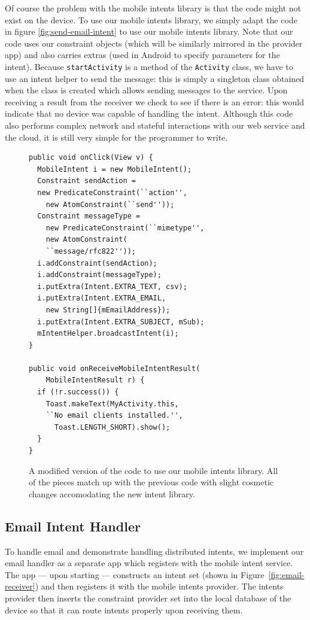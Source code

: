 \documentclass{acm_proc_article-sp}
\begin{document}
Of course the problem with the mobile intents library is that the code
might not exist on the device.  To use our mobile intents library, we
simply adapt the code in figure \ref{fig:send-email-intent} to use our
mobile intents library.  Note that our code uses our constraint
objects (which will be similarly mirrored in the provider app) and
also carries extras (used in Android to specify parameters for the
intent).  Because \texttt{startActivity} is a method of the
\texttt{Activity} class, we have to use an intent helper to send the
message: this is simply a singleton class obtained when the class is
created which allows sending messages to the service.  Upon receiving
a result from the receiver we check to see if there is an error: this
would indicate that no device was capable of handling the intent.
Although this code also performs complex network and stateful
interactions with our web service and the cloud, it is still very
simple for the programmer to write.

\begin{figure}[t]  
  \begin{lstlisting}
public void onClick(View v) {
  MobileIntent i = new MobileIntent();
  Constraint sendAction = 
  new PredicateConstraint(``action'', 
    new AtomConstraint(``send''));
  Constraint messageType = 
    new PredicateConstraint(``mimetype'', 
    new AtomConstraint(
    ``message/rfc822''));
  i.addConstraint(sendAction);
  i.addConstraint(messageType);
  i.putExtra(Intent.EXTRA_TEXT, csv);
  i.putExtra(Intent.EXTRA_EMAIL,
    new String[]{mEmailAddress});
  i.putExtra(Intent.EXTRA_SUBJECT, mSub);
  mIntentHelper.broadcastIntent(i);
}

public void onReceiveMobileIntentResult(
    MobileIntentResult r) {
  if (!r.success()) {
    Toast.makeText(MyActivity.this,
    ``No email clients installed.'',
      Toast.LENGTH_SHORT).show();
  }
}
\end{lstlisting}
\caption{A modified version of the code to use our mobile intents
  library.  All of the pieces match up with the previous code with
  slight cosmetic changes accomodating the new intent library.}
\label{fig:mobile-intents-email-example}
\end{figure}

\subsection{Email Intent Handler}

To handle email and demonstrate handling distributed intents, we
implement our email handler as a separate app which registers with the
mobile intent service.  The app --- upon starting --- constructs an
intent set (shown in Figure~\ref{fig:email-receiver}) and then
registers it with the mobile intents provider.  The intents provider
then inserts the constraint provider set into the local database of
the device so that it can route intents properly upon receiving them.
\end{document}
